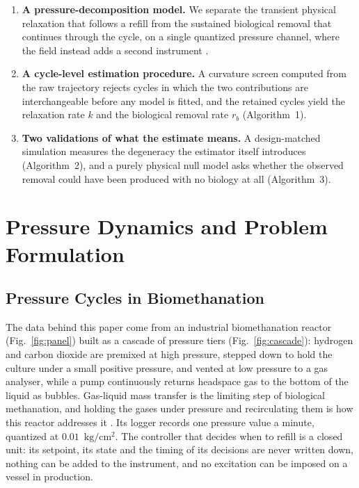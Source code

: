 \documentclass[runningheads]{llncs}
\newcommand{\pu}{\ensuremath{\mathrm{kg/cm^{2}}}}
\newcommand{\rb}{\ensuremath{r_{b}}}
\begin{document}
\begin{enumerate}
\item \textbf{A pressure-decomposition model.} We separate the
transient physical relaxation that follows a refill from the sustained
biological removal that continues through the cycle, on a single
quantized pressure channel, where the field instead adds a second
instrument \cite{hafner2018quantification}.
\item \textbf{A cycle-level estimation procedure.} A curvature screen
computed from the raw trajectory rejects cycles in which the two contributions
are interchangeable before any model is fitted, and the retained cycles
yield the relaxation rate $k$ and the biological removal rate \rb{}
(Algorithm~1).
\item \textbf{Two validations of what the estimate means.} A
design-matched simulation measures the degeneracy the estimator itself
introduces (Algorithm~2), and a purely physical null model asks whether
the observed removal could have been produced with no biology at all
(Algorithm~3).
\end{enumerate}

\section{Pressure Dynamics and Problem Formulation}
\label{sec:dynamics}

\subsection{Pressure Cycles in Biomethanation}

The data behind this paper come from an industrial biomethanation
reactor (Fig.~\ref{fig:panel}) built as a cascade of pressure
tiers (Fig.~\ref{fig:cascade}):
hydrogen and carbon dioxide are premixed at high pressure, stepped down
to hold the culture under a small positive pressure, and vented at low
pressure to a gas analyser, while a pump continuously returns headspace
gas to the bottom of the liquid as bubbles. Gas-liquid mass transfer is
the limiting step of biological methanation, and holding the gases
under pressure and recirculating them is how this reactor addresses it
\cite{yoruklu2025comprehensive}. Its logger records one pressure value
a minute, quantized at $0.01$~\pu{}. The controller that decides when
to refill is a closed unit: its setpoint, its state and the timing of
its decisions are never written down, nothing can be added to the
instrument, and no excitation can be imposed on a vessel in production.
\end{document}
